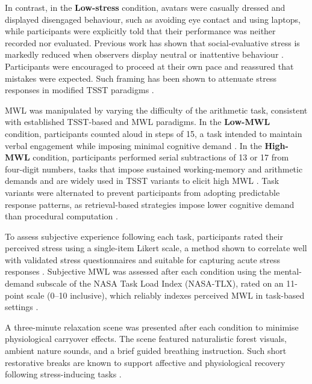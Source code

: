 \documentclass[lettersize,journal]{IEEEtran}
\begin{document}
In contrast, in the \textbf{Low-stress} condition, avatars were casually dressed and displayed disengaged behaviour, such as avoiding eye contact and using laptops, while participants were explicitly told that their performance was neither recorded nor evaluated. Previous work has shown that social-evaluative stress is markedly reduced when observers display neutral or inattentive behaviour \cite{yeImpactAudienceDynamics2024}. Participants were encouraged to proceed at their own pace and reassured that mistakes were expected. Such framing has been shown to attenuate stress responses in modified TSST paradigms \cite{wiemersFriendlyVersionTrier2013}.

MWL was manipulated by varying the difficulty of the arithmetic task, consistent with established TSST-based and MWL paradigms. In the \textbf{Low-MWL} condition, participants counted aloud in steps of 15, a task intended to maintain verbal engagement while imposing minimal cognitive demand \cite{guezEffectTrierSocial2016}. In the \textbf{High-MWL} condition, participants performed serial subtractions of 13 or 17 from four-digit numbers, tasks that impose sustained working-memory and arithmetic demands and are widely used in TSST variants to elicit high MWL \cite{giannakakisReviewPsychologicalStress2022}. Task variants were alternated to prevent participants from adopting predictable response patterns, as retrieval-based strategies impose lower cognitive demand than procedural computation \cite{sokolowskiNeuralCorrelatesRetrieval2023}.

To assess subjective experience following each task, participants rated their perceived stress using a single-item Likert scale, a method shown to correlate well with validated stress questionnaires and suitable for capturing acute stress responses \cite{littmanReliabilityValidity22006}. Subjective MWL was assessed after each condition using the mental-demand subscale of the NASA Task Load Index (NASA-TLX), rated on an 11-point scale (0–10 inclusive), which reliably indexes perceived MWL in task-based settings \cite{hartDevelopmentNASATLXTask1988}.

A three-minute relaxation scene was presented after each condition to minimise physiological carryover effects. The scene featured naturalistic forest visuals, ambient nature sounds, and a brief guided breathing instruction. Such short restorative breaks are known to support affective and physiological recovery following stress-inducing tasks \cite{chanNatureVirtualReality2021, albulescuGiveMeBreak2022, kumpulainenAssessingWellbeingBenefits2024}.
\end{document}
